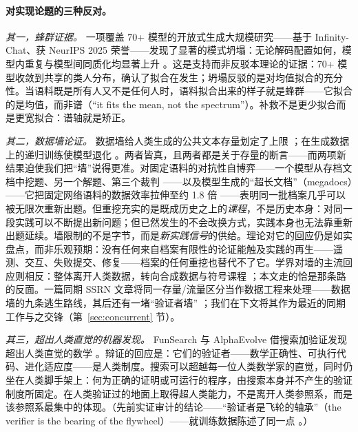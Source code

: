 \documentclass[10pt,fontset=fandol]{ctexart}
\begin{document}
\paragraph{对实现论题的三种反对。}

\emph{其一，蜂群证据。} 一项覆盖 70+ 模型的开放式生成大规模研究——基于 Infinity-Chat、获 NeurIPS 2025 荣誉——发现了显著的模式坍塌：无论解码配置如何，模型内重复与模型间同质化均显著上升 \cite{jiang2025hivemind}。这是支持而非反驳本理论的证据：70+ 模型收敛到共享的类人分布，确认了拟合在发生；坍塌反驳的是对均值拟合的充分性。当语料既是所有人又不是任何人时，语料拟合出来的样子就是蜂群——它拟合的是均值，而非谱（“it fits the mean, not the spectrum”）。补救不是更少拟合而是更宽拟合：谱轴就是矫正。

\emph{其二，数据墙论证。} 数据墙给人类生成的公共文本存量划定了上限 \cite{villalobos2022data}；在生成数据上的递归训练使模型退化 \cite{shumailov2024collapse}。两者皆真，且两者都是关于存量的断言——而两项新结果迫使我们把“墙”说得更准。对固定语料的对抗性自博弈——一个模型从存档文档中挖题、另一个解题、第三个裁判 \cite{liu2025spice}——以及模型生成的“超长文档”（megadocs）——它把固定网络语料的数据效率拉伸至约 1.8 倍 \cite{kim2026megadocs}——表明同一批档案几乎可以被无限次重新出题。但重挖充实的是既成历史之上的\emph{课程}，不是历史本身：对同一段实践可以不断提出新问题；但已然发生的不会改换方式，实践本身也无法靠重新出题延续。墙限制的不是字节，而是\emph{新实践信号}的供给。理论对它的回应仍是如实盘点，而非乐观预期：没有任何来自档案有限性的论证能触及实践的再生——遥测、交互、失败提交、修复——档案的任何重挖也替代不了它。学界对墙的主流回应则相反：整体离开人类数据，转向合成数据与符号课程 \cite{belova2026alternative}；本文走的恰是那条路的反面。一篇同期 SSRN 文章将同一存量/流量区分当作数据工程来处理——数据墙的九条逃生路线，其后还有一堵“验证者墙” \cite{gharbi2026model}；我们在下文将其作为最近的同期工作与之交锋（第~\ref{sec:concurrent} 节）。

\emph{其三，超出人类直觉的机器发现。} FunSearch 与 AlphaEvolve 借搜索加验证发现超出人类直觉的数学 \cite{romera2024mathematical, novikov2025alphaevolve}。辩证的回应是：它们的验证者——数学正确性、可执行代码、进化适应度——是人类制度。搜索可以超越每一位人类数学家的直觉，同时仍坐在人类脚手架上：何为正确的证明或可运行的程序，由搜索本身并不产生的验证制度所固定。在人类验证过的地面上取得超人类能力，不是离开人类参照系，而是该参照系最集中的体现。（先前实证审计的结论——“验证者是飞轮的轴承”（the verifier is the bearing of the flywheel）——就训练数据陈述了同一点 \cite{yu2026failure}。）
\end{document}

